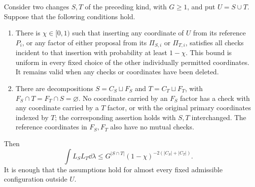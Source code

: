 \begin{lemma}\label{cmp:cancellation}
Consider two changes $S,T$ of the preceding kind, with $G\ge1$, and put
$U=S\cup T$. Suppose that the following conditions hold.
\begin{enumerate}[label=\textup{(\roman*)}]
 \item There is $\chi\in[0,1)$ such that inserting any coordinate of $U$
 from its reference $P_i$, or any factor of either proposal from its
 $\Pi_{S,i}$ or $\Pi_{T,i}$, satisfies all checks incident to that insertion
 with probability at least $1-\chi$. This bound is uniform in every fixed
 choice of the other individually permitted coordinates. It remains valid
 when any checks or coordinates have been deleted.
 \item There are decompositions $S=C_S\sqcup F_S$ and
 $T=C_T\sqcup F_T$, with $F_S\cap T=F_T\cap S=\varnothing$.
 No coordinate carried by an $F_S$ factor has a check with any coordinate
 carried by a $T$ factor, or with the original primary coordinates indexed
 by $T$; the corresponding assertion holds with $S,T$ interchanged.
 The reference coordinates in $F_S,F_T$ also have no mutual checks.
\end{enumerate}
Then
\begin{equation}\label{cmp:cancellation-bound}
 \int L_SL_T\dd\lambda
 \le G^{|S\cap T|}(1-\chi)^{-2(|C_S|+|C_T|)}.
\end{equation}
It is enough that the assumptions hold for almost every fixed admissible
configuration outside $U$.
\end{lemma}

